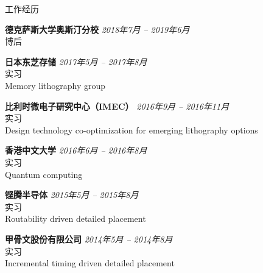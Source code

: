 
\begin{rSection}{工作经历}

{\bf 德克萨斯大学奥斯汀分校}                           \hfill {\em 2018年7月 -- 2019年6月} \\
博后

{\bf 日本东芝存储}                           \hfill {\em 2017年5月 -- 2017年8月} \\
实习 \\
Memory lithography group

{\bf 比利时微电子研究中心（IMEC）}                           \hfill {\em 2016年9月 -- 2016年11月} \\
实习 \\
Design technology co-optimization for emerging lithography options

{\bf 香港中文大学}                           \hfill {\em 2016年6月 -- 2016年8月} \\
实习 \\
Quantum computing

{\bf 铿腾半导体}                           \hfill {\em 2015年5月 -- 2015年8月} \\
实习 \\
Routability driven detailed placement

{\bf 甲骨文股份有限公司}                           \hfill {\em 2014年5月 -- 2014年8月} \\
实习 \\
Incremental timing driven detailed placement


\end{rSection}


